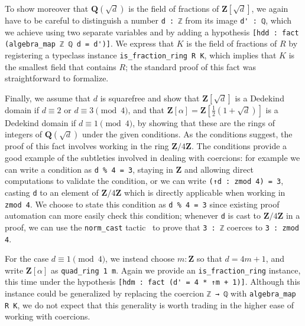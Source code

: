 \documentclass[sigplan,10pt,nonacm,
screen]{acmart} \settopmatter{printfolios=true,printccs=false,printacmref=false}
\newcommand{\QQ}{\mathbf{Q}}
\newcommand{\ZZ}{\mathbf{Z}}
\begin{document}
    To show moreover that $\QQ(\sqrt{d})$ is the field of fractions of $\ZZ[\sqrt{d}]$,
    we again have to be careful to distinguish a number \lstinline{d : ℤ} from its image \lstinline{d' : ℚ},
    which we achieve using two separate variables and by adding a hypothesis \lstinline{[hdd : fact (algebra_map ℤ ℚ d = d')]}.
    We express that $K$ is the field of fractions of $R$ by registering a typeclass instance \lstinline{is_fraction_ring R K},
    which implies that $K$ is the smallest field that contains $R$;
    the standard proof of this fact was straightforward to formalize.

    Finally, we assume that $d$ is squarefree
    and show that $\ZZ[\sqrt{d}]$ is a Dedekind domain if $d \equiv 2$ or $d \equiv 3 \pmod 4$,
    and that $\ZZ[\alpha] = \ZZ[\frac{1}{2}(1 + \sqrt{d})]$ is a Dedekind domain if $d \equiv 1 \pmod 4$,
    by showing that these are the rings of integers of $\QQ(\sqrt d)$ under the given conditions.
    As the conditions suggest, the proof of this fact involves working in the ring $\ZZ / 4\ZZ$.
    The conditions provide a good example of the subtleties involved in dealing with coercions:
    for example we can write a condition as \lstinline{d % 4 = 3}, staying in $\ZZ$ and allowing direct computations to validate the condition,
    or we can write \lstinline{(↑d : zmod 4) = 3}, casting \lstinline{d} to an element of $\ZZ / 4\ZZ$ which is directly applicable when working in \lstinline{zmod 4}.
We choose to state this condition as \lstinline{d % 4 = 3} since existing proof automation can more easily check this condition;
whenever \lstinline{d} is cast to $\ZZ / 4\ZZ$ in a proof,
we can use the \lstinline{norm_cast} tactic~\cite{norm_cast} to prove that \lstinline{3 : ℤ} coerces to \lstinline{3 : zmod 4}.

    For the case $d \equiv 1 \pmod 4$, we instead choose $m : \ZZ$ so that $d = 4m + 1$,
    and write $\ZZ[\alpha]$ as \lstinline{quad_ring 1 m}.
    Again we provide an \lstinline{is_fraction_ring} instance, this time under the hypothesis \lstinline{[hdm : fact (d' = 4 * ↑m + 1)]}.
Although this instance could be generalized by replacing the coercion \lstinline{ℤ → ℚ} with \lstinline{algebra_map R K},
    we do not expect that this generality is worth trading in the higher ease of working with coercions.
\end{document}
